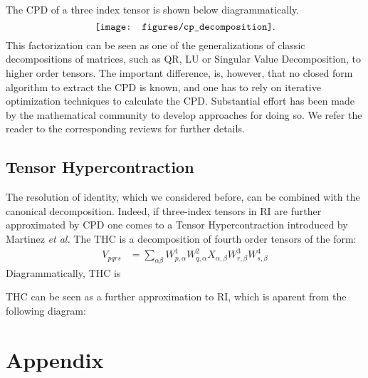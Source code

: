 The CPD of a three index tensor is shown below diagrammatically.
\begin{equation}
\vcenter{\hbox{\texttt{[image: figures/cp\_decomposition]}}}
.
\label{fig:cp_decomposition}
\end{equation}
%
This factorization can be seen as one of the generalizations of classic 
decompositions of matrices, such as QR, LU or Singular Value Decomposition, to 
higher order tensors.\cite{kolda2009tensor} The important difference, is, 
however, that no closed form algorithm to extract the CPD is known, and one has 
to rely on iterative optimization techniques to calculate the 
CPD.\cite{sorber2013optimization} Substantial effort has been made by the 
mathematical community to develop approaches for doing so. We refer the reader 
to the corresponding reviews\cite{kolda2009tensor, sidiropoulos2016tensor} for 
further details.

\subsection{Tensor Hypercontraction}
The resolution of identity, which we considered before, can be combined with 
the canonical decomposition. Indeed, if three-index tensors in RI are further 
approximated by CPD one comes to a Tensor Hypercontraction introduced by 
Martinez \emph{et al.}\cite{hohenstein_thc1, hohenstein_thc2, hohenstein_thc3}
The THC is a decomposition of fourth order tensors of the form:
\begin{equation}
\begin{split} V_{pqrs} & = \sum_{\alpha \beta} W^{1}_{p,\alpha} W^{2}_{q, 
\alpha}
X_{\alpha, \beta} W^{3}_{r, \beta} W^{4}_{s, \beta} 
\end{split}
\label{eq:thc_definition}
\end{equation}
Diagrammatically, THC is

THC can be seen as a further approximation to RI, which is aparent from the 
following diagram:


\section{Appendix}
\label{sec:Appendix} 